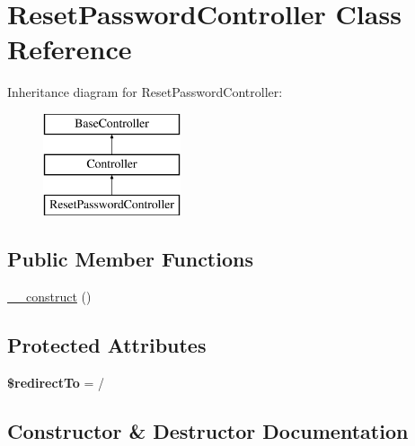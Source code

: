 \hypertarget{class_app_1_1_http_1_1_controllers_1_1_auth_1_1_reset_password_controller}{}\section{Reset\+Password\+Controller Class Reference}
\label{class_app_1_1_http_1_1_controllers_1_1_auth_1_1_reset_password_controller}
Inheritance diagram for Reset\+Password\+Controller\+:\begin{figure}[H]
\begin{center}
\leavevmode
\includegraphics[height=3.000000cm]{class_app_1_1_http_1_1_controllers_1_1_auth_1_1_reset_password_controller}
\end{center}
\end{figure}
\subsection*{Public Member Functions}
\begin{DoxyCompactItemize}
\item 
\mbox{\hyperlink{class_app_1_1_http_1_1_controllers_1_1_auth_1_1_reset_password_controller_a095c5d389db211932136b53f25f39685}{\+\_\+\+\_\+construct}} ()
\end{DoxyCompactItemize}
\subsection*{Protected Attributes}
\begin{DoxyCompactItemize}
\item 
\mbox{\label{class_app_1_1_http_1_1_controllers_1_1_auth_1_1_reset_password_controller_a1d19101ee5de7186666ce86a530cd501}} 
{\bfseries \$redirect\+To} = \textquotesingle{}/\textquotesingle{}
\end{DoxyCompactItemize}


\subsection{Constructor \& Destructor Documentation}
\mbox{\label{class_app_1_1_http_1_1_controllers_1_1_auth_1_1_reset_password_controller_a095c5d389db211932136b53f25f39685}} 
